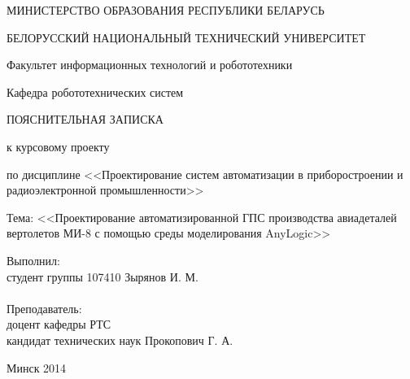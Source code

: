 \begin{titlepage} %

\thispagestyle{empty} %

\begin{center}
МИНИСТЕРСТВО ОБРАЗОВАНИЯ РЕСПУБЛИКИ БЕЛАРУСЬ

БЕЛОРУССКИЙ НАЦИОНАЛЬНЫЙ ТЕХНИЧЕСКИЙ УНИВЕРСИТЕТ

Факультет информационных технологий и робототехники

Кафедра робототехнических систем
\end{center}

\vfill

\begin{center}

    \large{ПОЯСНИТЕЛЬНАЯ ЗАПИСКА}

    \large{к курсовому проекту}

    \normalsize{по дисциплине <<Проектирование систем автоматизации в приборостроении и радиоэлектронной промышленности>>}

    \normalsize{Тема: <<Проектирование автоматизированной ГПС производства авиадеталей вертолетов МИ-8 с помощью среды моделирования AnyLogic>>}
\end{center}

\vfill

\noindent
Выполнил:\\
студент группы 107410 \hfill Зырянов И. М.
\\
\\
\noindent
Преподаватель:\\
доцент кафедры РТС\\
кандидат технических наук \hfill Прокопович Г. А.

\vfill

\centerline{Минск 2014}

\clearpage %

\end{titlepage}
\setcounter{page}{4}
